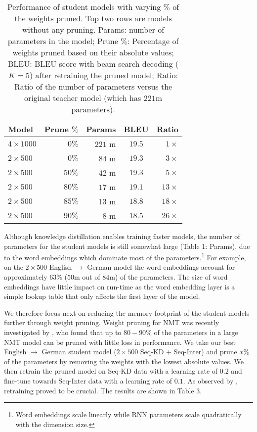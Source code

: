 \documentclass[11pt,letterpaper]{article}
\begin{document}
\begin{table}[t] \label{prune}
\centering
\small
\begin{tabular}{l  r  r c  r }
\toprule
Model & Prune $\%$ & Params & BLEU & Ratio \\
\midrule 
$4 \times 1000$ & $0\%$ &$221$ m& $19.5$& $1 \times$   \\
$2 \times 500$ &  $0\%$& $84$ m& $19.3$& $3 \times$   \\
\midrule
$2 \times 500$ & $50\%$& $42$ m&  $19.3$ & $5 \times$ \\
$2 \times 500$ &  $80\%$& $17$ m&  $19.1$ & $13 \times$ \\
$2 \times 500$ &  $85\%$& $13$ m&  $18.8$ & $18 \times$ \\
$2 \times 500$ &  $90\%$& $8$ m &  $18.5$  & $26 \times$ \\

\bottomrule
\end{tabular}
\caption{Performance of student models with varying $\%$ of the weights pruned. Top two
rows are models without any pruning.
Params: number of parameters in the model; Prune $\%$: Percentage of weights pruned based on their absolute values;
BLEU: BLEU score with beam search decoding ($K = 5$) after retraining the pruned model; 
Ratio: Ratio of the number of parameters versus the original teacher model 
(which has $221$m parameters).
}
\end{table}

Although knowledge distillation enables training faster models,
the number of parameters for the student models is still somewhat
large (Table 1: Params), due to the word embeddings which dominate most of the parameters.\footnote{Word
embeddings scale linearly while RNN parameters scale quadratically with the dimension size.}
For example, on the $2 \times 500$ English $\rightarrow$ German model
the word embeddings account for approximately $63\%$ ($50$m out of $84$m) of the parameters.
The size of word embeddings have little impact on run-time as the word embedding layer is
 a simple lookup table that only affects the first layer of the model.

We therefore focus next on reducing the memory footprint of the student models further through 
weight pruning. Weight pruning for NMT was recently investigated by , who found that up to 
$80-90\%$ of the parameters in a large NMT model can be pruned with little loss in performance.
We take our best 
English $\rightarrow$ German student model ($2 \times 500$ Seq-KD $+$ Seq-Inter) and prune $x\%$ of the parameters by removing
the weights with the lowest absolute values.
We then retrain the pruned model on Seq-KD data with a learning rate of $0.2$ 
and fine-tune towards Seq-Inter data with a learning rate of $0.1$. As observed by ,
retraining proved to be crucial. The results are shown in Table 3. 
\end{document}
